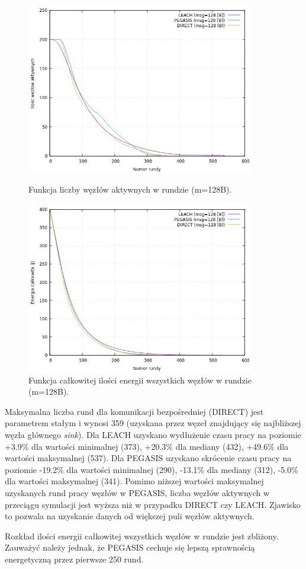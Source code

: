 \documentclass[a4paper,12pt,twoside,openany]{report}
\begin{document}
\begin{figure}[H]
 \centering
 \includegraphics[width=10cm]{images/gnuplot/test_1/nodes_in_round_m128.png}
 \caption{Funkcja liczby węzłów aktywnych w rundzie (m=128B).}
 \includegraphics[width=10cm]{images/gnuplot/test_1/energy_in_round_m128.png}
 \caption{Funkcja całkowitej ilości energii wszystkich węzłów w rundzie (m=128B).}
\end{figure}

\par
Maksymalna liczba rund dla komunikacji bezpośredniej (DIRECT) jest parametrem stałym i wynosi 359 (uzyskana przez węzeł znajdujący się najbliższej węzła głównego \textit{sink}).
Dla LEACH uzyskano wydłużenie czasu pracy na poziomie +3.9\% dla wartości minimalnej (373), +20.3\% dla mediany (432), +49.6\% dla wartości maksymalnej (537).
Dla PEGASIS uzyskano skrócenie czasu pracy na poziomie -19.2\% dla wartości minimalnej (290), -13.1\% dla mediany (312), -5.0\% dla wartości maksymalnej (341).
Pomimo niższej wartości maksymalnej uzyskanych rund pracy węzłów w PEGASIS, liczba węzłów aktywnych w przeciągu symulacji jest wyższa niż w przypadku DIRECT czy LEACH.
Zjawisko to pozwala na uzyskanie danych od większej puli węzłów aktywnych.
\par
Rozkład ilości energii całkowitej wszystkich węzłów w rundzie jest zbliżony.
Zauważyć należy jednak, że PEGASIS cechuje się lepszą sprawnością energetyczną przez pierwsze 250 rund.
\end{document}
